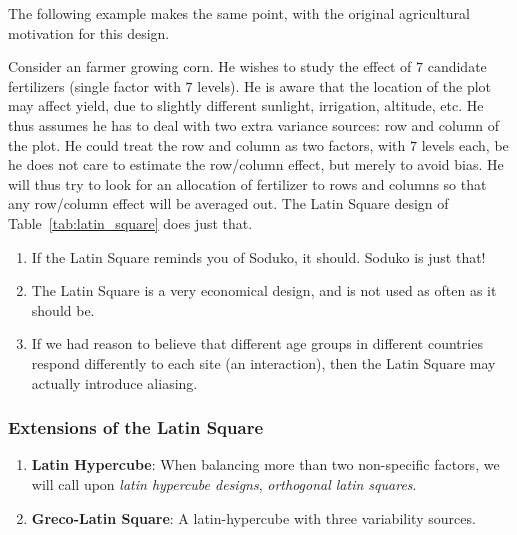 The following example makes the same point, with the original agricultural motivation for this design.
\begin{example}
\label{eg:latin_square}
Consider an farmer growing corn.
He wishes to study the effect of $7$ candidate fertilizers (single factor with $7$ levels).
He is aware that the location of the plot may affect yield, due to slightly different sunlight, irrigation, altitude, etc.
He thus assumes he has to deal with two extra variance sources: row and column of the plot. 
He could treat the row and column as two factors, with $7$ levels each, be he does not care to estimate the row/column effect, but merely to avoid bias.
He will thus try to look for an allocation of fertilizer to rows and columns so that any row/column effect will be averaged out.
The Latin Square design of Table~\ref{tab:latin_square} does just that.
\end{example}


\begin{extra}\noindent
\begin{enumerate}
\item If the Latin Square reminds you of Soduko, it should. Soduko is just that!
\item The Latin Square is a very economical design, and is not used as often as it should be.
\item If we had reason to believe that different age groups in different countries respond differently to each site (an interaction), then the Latin Square may actually introduce aliasing. 
\end{enumerate}
\end{extra}



\subsubsection{Extensions of the Latin Square}
\begin{enumerate}
\item \textbf{Latin Hypercube}: When balancing more than two non-specific factors, we will call upon \emph{latin hypercube designs}, \aka \emph{orthogonal latin squares}. 
\item \textbf{Greco-Latin Square}: A latin-hypercube with three variability sources. 
\end{enumerate}






